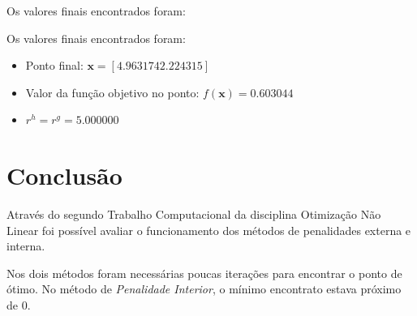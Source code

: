 \documentclass[10pt,a4paper]{article}
\begin{document}
	Os valores finais encontrados foram:

	Os valores finais encontrados foram:

	\begin{itemize}

		\item Ponto final: $\bm{x} = [4.963174 2.224315]$
		\item Valor da função objetivo no ponto: $f(\bm{x}) = 0.603044$
		\item $r^h = r^g = 5.000000$

	\end{itemize}

	\section{Conclusão}

	Através do segundo Trabalho Computacional da disciplina Otimização Não Linear foi possível avaliar o funcionamento dos métodos de penalidades 
	externa e interna.

	Nos dois métodos foram necessárias poucas iterações para encontrar o ponto de ótimo. No método de \emph{Penalidade Interior}, o mínimo encontrato estava próximo de $0$.
\end{document}
